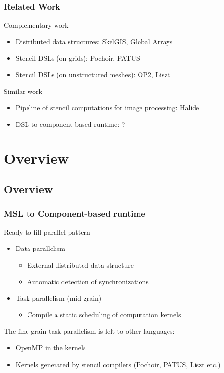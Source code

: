 \documentclass{beamer}
\begin{document}
\begin{frame}
\frametitle{Related Work}
\begin{block}{Complementary work}
\begin{itemize}
\item Distributed data structures: SkelGIS, Global Arrays
\item Stencil DSLs (on grids): Pochoir, PATUS
\item Stencil DSLs (on unstructured meshes): OP2, Liszt
\end{itemize}
\end{block}
\begin{alertblock}{Similar work}
\begin{itemize}
\item Pipeline of stencil computations for image processing: Halide
\item DSL to component-based runtime: ?
\end{itemize}
\end{alertblock}
\end{frame}

\section{Overview}
\subsection{Overview}

\begin{frame}
\frametitle{MSL to Component-based runtime}
\begin{block}{Ready-to-fill parallel pattern}
\begin{itemize}
\item Data parallelism
\begin{itemize}
\item External distributed data structure
\item Automatic detection of synchronizations
\end{itemize}
\item Task parallelism (mid-grain)
\begin{itemize}
\item Compile a static scheduling of computation kernels
\end{itemize}
\end{itemize}
\end{block}
The fine grain task parallelism is left to other languages: 
\begin{itemize}
\item OpenMP in the kernels
\item Kernels generated by stencil compilers (Pochoir, PATUS, Liszt etc.)
\end{itemize}
\end{frame}
\end{document}

